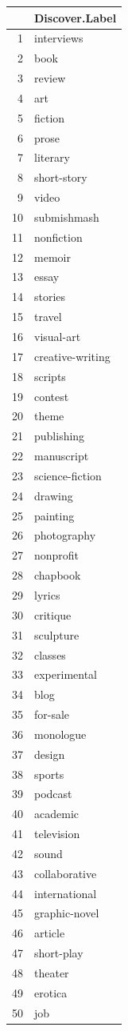 \documentclass[]{report}   %
\begin{document}
\begin{minipage}{0.24\textwidth}

\begin{tabular}{rl}
  \hline
 & Discover.Label \\ 
  \hline
1 & interviews \\ 
  2 & book \\ 
  3 & review \\ 
  4 & art \\ 
  5 & fiction \\ 
  6 & prose \\ 
  7 & literary \\ 
  8 & short-story \\ 
  9 & video \\ 
  10 & submishmash \\ 
  11 & nonfiction \\ 
  12 & memoir \\ 
  13 & essay \\ 
  14 & stories \\ 
  15 & travel \\ 
  16 & visual-art \\ 
  17 & creative-writing \\ 
  18 & scripts \\ 
  19 & contest \\ 
  20 & theme \\ 
  21 & publishing \\ 
  22 & manuscript \\ 
  23 & science-fiction \\ 
  24 & drawing \\ 
  25 & painting \\ 
  26 & photography \\ 
  27 & nonprofit \\ 
  28 & chapbook \\ 
  29 & lyrics \\ 
  30 & critique \\ 
  31 & sculpture \\ 
  32 & classes \\ 
  33 & experimental \\ 
  34 & blog \\ 
  35 & for-sale \\ 
  36 & monologue \\ 
  37 & design \\ 
  38 & sports \\ 
  39 & podcast \\ 
  40 & academic \\ 
  41 & television \\ 
  42 & sound \\ 
  43 & collaborative \\ 
  44 & international \\ 
  45 & graphic-novel \\ 
  46 & article \\ 
  47 & short-play \\ 
  48 & theater \\ 
  49 & erotica \\ 
  50 & job \\ 
  \hline
\end{tabular}
    \end{minipage}
\end{document}
